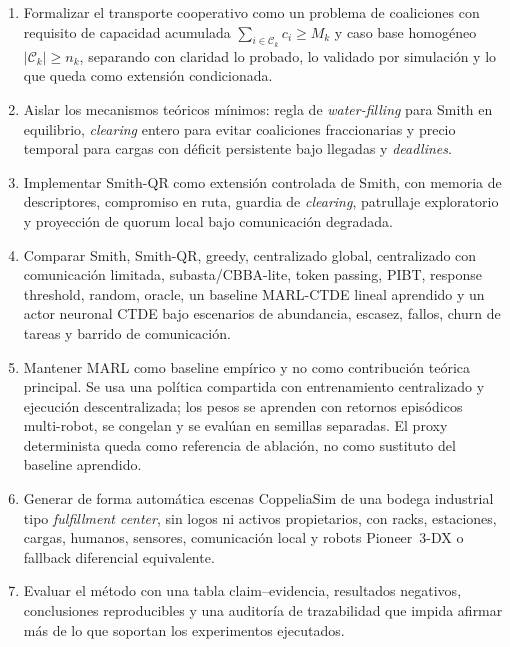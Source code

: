 \begin{enumerate}
  \item Formalizar el transporte cooperativo como un problema de coaliciones con
  requisito de capacidad acumulada $\sum_{i\in\mathcal{C}_k}c_i\geq M_k$ y caso base
  homogéneo $|\mathcal{C}_k|\geq n_k$, separando con claridad lo probado, lo validado
  por simulación y lo que queda como extensión condicionada.

  \item Aislar los mecanismos teóricos mínimos: regla de \emph{water-filling} para
  Smith en equilibrio, \emph{clearing} entero para evitar coaliciones fraccionarias y
  precio temporal para cargas con déficit persistente bajo llegadas y \emph{deadlines}.

  \item Implementar Smith-QR como extensión controlada de Smith, con memoria de
  descriptores, compromiso en ruta, guardia de \emph{clearing}, patrullaje exploratorio
  y proyección de quorum local bajo comunicación degradada.

  \item Comparar Smith, Smith-QR, greedy, centralizado global, centralizado con
  comunicación limitada, subasta/CBBA-lite, token passing, PIBT, response threshold,
  random, oracle, un baseline MARL-CTDE lineal aprendido y un actor neuronal CTDE bajo escenarios de abundancia,
  escasez, fallos, churn de tareas y barrido de comunicación.

  \item Mantener MARL como baseline empírico y no como contribución teórica principal.
  Se usa una política compartida con entrenamiento centralizado y ejecución
  descentralizada; los pesos se aprenden con retornos episódicos multi-robot, se congelan
  y se evalúan en semillas separadas. El proxy determinista queda como referencia de
  ablación, no como sustituto del baseline aprendido.

  \item Generar de forma automática escenas CoppeliaSim de una bodega industrial tipo
  \emph{fulfillment center}, sin logos ni activos propietarios, con racks, estaciones,
  cargas, humanos, sensores, comunicación local y robots Pioneer~3-DX o fallback
  diferencial equivalente.

  \item Evaluar el método con una tabla claim--evidencia, resultados negativos,
  conclusiones reproducibles y una auditoría de trazabilidad que impida afirmar más de
  lo que soportan los experimentos ejecutados.
\end{enumerate}

